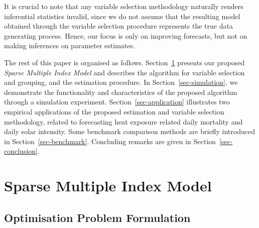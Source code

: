 \documentclass[
  11pt,
  a4paper,
]{article}
\begin{document}
It is crucial to note that any variable selection methodology naturally
renders inferential statistics invalid, since we do not assume that the
resulting model obtained through the variable selection procedure
represents the true data generating process. Hence, our focus is only on
improving forecasts, but not on making inferences on parameter
estimates.

The rest of this paper is organised as follows. Section~\ref{sec-SMI}
presents our proposed \emph{Sparse Multiple Index Model} and describes
the algorithm for variable selection and grouping, and the estimation
procedure. In Section~\ref{sec-simulation}, we demonstrate the
functionality and characteristics of the proposed algorithm through a
simulation experiment. Section~\ref{sec-application} illustrates two
empirical applications of the proposed estimation and variable selection
methodology, related to forecasting heat exposure related daily
mortality and daily solar intensity. Some benchmark comparison methods
are briefly introduced in Section~\ref{sec-benchmark}. Concluding
remarks are given in Section~\ref{sec-conclusion}.

\section{Sparse Multiple Index Model}\label{sec-SMI}

\subsection{Optimisation Problem
Formulation}\label{optimisation-problem-formulation}
\end{document}
